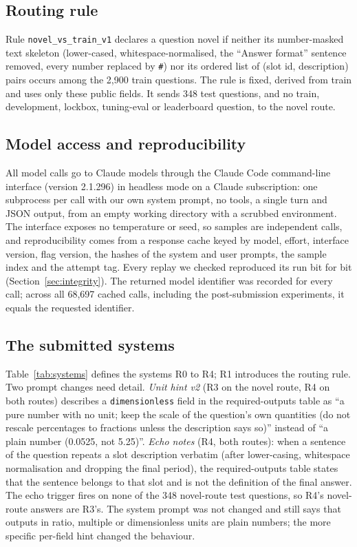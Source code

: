 \documentclass[conference]{IEEEtran}
\newcommand{\id}[1]{\texttt{#1}}
\begin{document}
\subsection{Routing rule}\label{sec:routing}
Rule \id{novel\_vs\_train\_v1} declares a question novel if neither its number-masked text skeleton (lower-cased, whitespace-normalised, the ``Answer format'' sentence removed, every number replaced by \id{\#}) nor its ordered list of (slot id, description) pairs occurs among the 2,900 train questions. The rule is fixed, derived from train and uses only these public fields. It sends 348 test questions, and no train, development, lockbox, tuning-eval or leaderboard question, to the novel route.

\subsection{Model access and reproducibility}\label{sec:model}
All model calls go to Claude models through the Claude Code command-line interface (version 2.1.296) in headless mode on a Claude subscription: one subprocess per call with our own system prompt, no tools, a single turn and JSON output, from an empty working directory with a scrubbed environment. The interface exposes no temperature or seed, so samples are independent calls, and reproducibility comes from a response cache keyed by model, effort, interface version, flag version, the hashes of the system and user prompts, the sample index and the attempt tag. Every replay we checked reproduced its run bit for bit (Section~\ref{sec:integrity}). The returned model identifier was recorded for every call; across all 68,697 cached calls, including the post-submission experiments, it equals the requested identifier.

\subsection{The submitted systems}\label{sec:systems}
Table~\ref{tab:systems} defines the systems R0 to R4; R1 introduces the routing rule. Two prompt changes need detail. \emph{Unit hint v2} (R3 on the novel route, R4 on both routes) describes a \id{dimensionless} field in the required-outputs table as ``a pure number with no unit; keep the scale of the question's own quantities (do not rescale percentages to fractions unless the description says so)'' instead of ``a plain number (0.0525, not 5.25)''. \emph{Echo notes} (R4, both routes): when a sentence of the question repeats a slot description verbatim (after lower-casing, whitespace normalisation and dropping the final period), the required-outputs table states that the sentence belongs to that slot and is not the definition of the final answer. The echo trigger fires on none of the 348 novel-route test questions, so R4's novel-route answers are R3's. The system prompt was not changed and still says that outputs in ratio, multiple or dimensionless units are plain numbers; the more specific per-field hint changed the behaviour.
\end{document}
